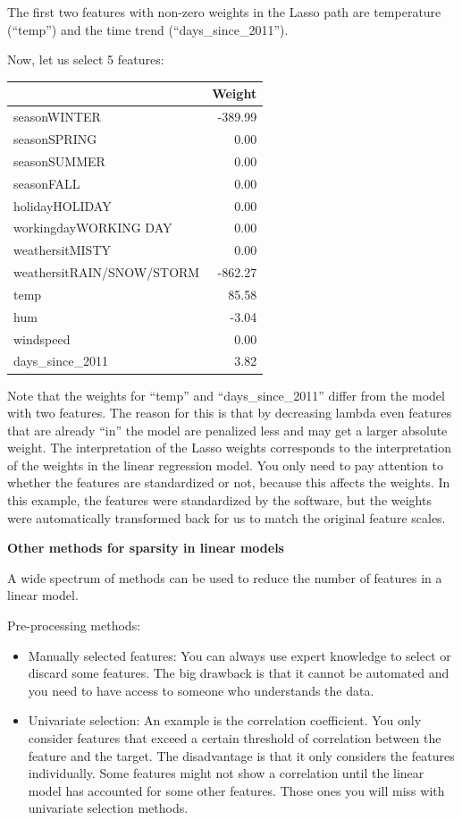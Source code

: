 \documentclass[
  11pt,
]{scrbook}
\providecommand{\tightlist}{%
  \setlength{\itemsep}{0pt}\setlength{\parskip}{0pt}}
\begin{document}
The first two features with non-zero weights in the Lasso path are temperature (``temp'') and the time trend (``days\_since\_2011'').

Now, let us select 5 features:

\begin{table}
\centering
\begin{tabular}{lr}
\toprule
  & Weight\\
\midrule
seasonWINTER & -389.99\\
seasonSPRING & 0.00\\
seasonSUMMER & 0.00\\
seasonFALL & 0.00\\
holidayHOLIDAY & 0.00\\
\addlinespace
workingdayWORKING DAY & 0.00\\
weathersitMISTY & 0.00\\
weathersitRAIN/SNOW/STORM & -862.27\\
temp & 85.58\\
hum & -3.04\\
\addlinespace
windspeed & 0.00\\
days\_since\_2011 & 3.82\\
\bottomrule
\end{tabular}
\end{table}

Note that the weights for ``temp'' and ``days\_since\_2011'' differ from the model with two features.
The reason for this is that by decreasing lambda even features that are already ``in'' the model are penalized less and may get a larger absolute weight.
The interpretation of the Lasso weights corresponds to the interpretation of the weights in the linear regression model.
You only need to pay attention to whether the features are standardized or not, because this affects the weights.
In this example, the features were standardized by the software, but the weights were automatically transformed back for us to match the original feature scales.

\textbf{Other methods for sparsity in linear models}

A wide spectrum of methods can be used to reduce the number of features in a linear model.

Pre-processing methods:

\begin{itemize}
\tightlist
\item
  Manually selected features:
  You can always use expert knowledge to select or discard some features.
  The big drawback is that it cannot be automated and you need to have access to someone who understands the data.
\item
  Univariate selection:
  An example is the correlation coefficient.
  You only consider features that exceed a certain threshold of correlation between the feature and the target.
  The disadvantage is that it only considers the features individually.
  Some features might not show a correlation until the linear model has accounted for some other features.
  Those ones you will miss with univariate selection methods.
\end{itemize}
\end{document}
